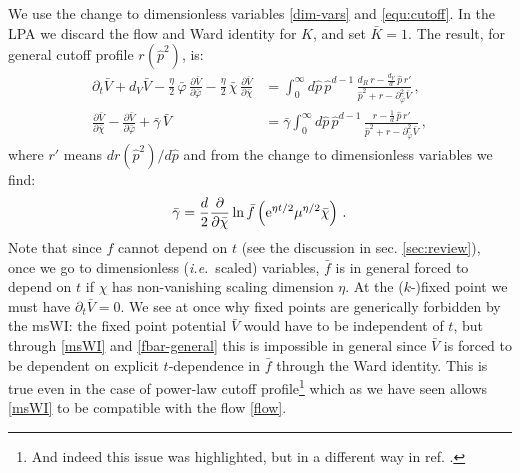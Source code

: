 \documentclass[11pt,a4paper]{article}
\numberwithin{figure}{section}
\numberwithin{equation}{section}
\newcommand\ie{\textit{i.e.}\ }
\newcommand{\be}{\begin{equation}}
\newcommand{\ee}{\end{equation}}
\newcommand{\bc}{\bar \chi} %
\newcommand{\bV}{\bar V} %
\begin{document}
We use the change to dimensionless variables \eqref{dim-vars} and \eqref{equ:cutoff}. In the LPA we discard the flow and Ward identity for $K$, and set $\bar K=1$. The result, for general cutoff profile $r(\hat{p}^2)$, is:
\begin{align}
\label{flow}
\partial_t \bar V + d_V \bar V - \frac{\eta}{2} \, \bar\varphi \, \frac{\partial \bar V}{\partial \bar\varphi} - \frac{\eta}{2} \, \bar\chi \, \frac{\partial \bar V}{\partial \bar\chi} &=
\int_0^{\infty} d\hat p \, \hat p^{d-1} \, \frac{d_R\, r - \frac{d_V}{d} \, \hat p \, r'}{\hat p^2 + r - \partial^2_{\bar\varphi}\bar V}\,,\\
\label{msWI}
\frac{\partial \bar V}{\partial \bar\chi} - \frac{\partial \bar V}{\partial \bar\varphi} + \bar \gamma \, \bar V &= \bar \gamma
\int_0^{\infty} d\hat p \, \hat p^{d-1} \, \frac{r - \frac{1}{d} \, \hat p \, r'}{\hat p^2 + r - \partial^2_{\bar\varphi}\bar V} \,,
\end{align}
where $r'$ means $dr(\hat{p}^2)/d\hat{p}$ and from the change to dimensionless variables we find:
\be 
\label{fbar-general}
\bar{\gamma} = \frac{d}{2}\frac{\partial}{\partial\bc}\ln\bar{f}\left({\rm e}^{\eta t/2}\mu^{\eta/2}\bc\right)\,.
\ee
Note that since $f$ cannot depend on $t$ (see the discussion in sec. \ref{sec:review}), once we go to dimensionless (\ie scaled) variables, $\bar{f}$ is in general forced to depend on $t$ if $\chi$ has non-vanishing scaling dimension $\eta$.
At the ($k$-)fixed point we must have $\partial_t \bar V = 0$. We see at once why fixed points are generically forbidden by the msWI: the fixed point potential $\bar{V}$ would have to be independent of $t$, but through \eqref{msWI} and \eqref{fbar-general} this is impossible in general since $\bV$ is forced to be dependent on explicit $t$-dependence in $\bar{f}$ through the Ward identity. This is true even in the case of power-law cutoff profile\footnote{And indeed this issue was highlighted, but in a different way in ref. \cite{Dietz:2015owa}.} which as we have seen allows \eqref{msWI} to be compatible with the flow \eqref{flow}.

 
\end{document}
